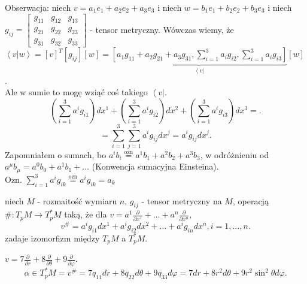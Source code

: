 \documentclass[../main.tex]{subfiles}
\begin{document}
Obserwacja: niech $v = a_1e_1 + a_2e_2 + a_3e_3$ i niech $w = b_1e_1 + b_2e_2 + b_3e_3$ i niech $g_{ij} = \begin{bmatrix} g_{11}&g_{12}&g_{13}\\ g_{21}& g_{22}&g_{23}\\ g_{31}&g_{32}&g_{33} \end{bmatrix} $ - tensor metryczny. Wówczas wiemy, że $\left<v|w \right> = \left[v\right]^T\left[ g_{ij} \right] \left[ w \right] = \underbrace{\left[ a_1g_{11}+a_2g_{21}+a_3g_{31},\sum_{i=1}^{3}a_ig_{i2},\sum_{i=1}^3a_ig_{i3} \right]}_{\left< v\right|}\left[ w \right]  $. \\
Ale w sumie to mogę wziąć coś takiego $\left< v \right|$.\\
\[
    \left( \sum_{i=1}^3 a^ig_{i1} \right) dx^1 + \left( \sum_{i=1}^3a^ig_{i2} \right) dx^2 + \left( \sum_{i=1}^3a^ig_{i3} \right)dx^3=
.\]
\[
= \sum_{i=1}^3\sum_{j=1}^3 a^ig_{ij}dx^j = a^ig_{ij}dx^j
.\]
Zapomniałem o sumach, bo $a^ib_i \overset{\text{ozn}}{=}  a^1b_1 + a^2b_2 + a^3b_3$, w odróżnieniu od $a^{\mu}b_\mu = a^0b_0+a^1b_1+\ldots$ (Konwencja sumacyjna Einsteina).\\
Ozn. $\sum_{i=1}^3 a^ig_{ik} \overset{\text{ozn}}{=} a^ig_{ik} = a_k$
\begin{definicja}
    niech $M$ - rozmaitość wymiaru $n$, $g_{ij}$ - tensor metryczny na $M$, operacją $\#: T_pM \to T_p^*M$ taką, że dla $v = a^1 \frac{\partial }{\partial x^1} + \ldots + a^n \frac{\partial }{\partial x^n} $,\\
    \[
    v^{\#}=a^ig_{i1}dx^1 + a^ig_{i2}dx^2 + \ldots + a^ig_{in}dx^n, i=1,\ldots,n
    .\]
    zadaje izomorfizm między $T_pM$ a $T_p^*M$.
\end{definicja}
\begin{przyklad}
    $v = 7 \frac{\partial }{\partial r} + 8 \frac{\partial }{\partial \theta} + 9 \frac{\partial }{\partial \varphi}$.
    \[
    \alpha\in T_p^*M  = v^{\#} = 7q_{11}dr+8q_{22}d\theta + 9q_{33}d\varphi = 7dr + 8r^2d\theta + 9r^2\sin^2\theta d\varphi
    .\]
\end{przyklad}
\end{document}
